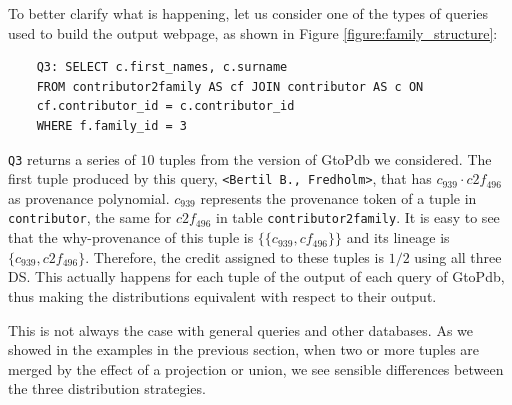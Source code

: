 To better clarify what is happening, let us consider one of the types of queries used to build the output webpage, as shown in Figure \ref{figure:family_structure}:

\vspace{2mm}
{\footnotesize
\begin{adjustwidth}{25pt}{5pt}
	\begin{verbatim}
	Q3: SELECT c.first_names, c.surname
	FROM contributor2family AS cf JOIN contributor AS c ON 
	cf.contributor_id = c.contributor_id 
	WHERE f.family_id = 3
\end{verbatim}
\end{adjustwidth}
}
\vspace{2mm}

\texttt{Q3} returns a series of $10$ tuples from the version of GtoPdb we considered. 
The first tuple produced by this query, \texttt{<Bertil B., Fredholm>}, that has $c_{939} \cdot c2f_{496}$ as provenance polynomial.
$c_{939}$ represents the provenance token of a tuple in \texttt{contributor}, the same for $c2f_{496}$ in table \texttt{contributor2family}. 
It is easy to see that the why-provenance of this tuple is $\{\{c_{939}, cf_{496} \}\}$ and its lineage is $\{c_{939}, c2f_{496} \}$.
Therefore, the credit assigned to these tuples is $1/2$ using all three DS.
This actually happens for each tuple of the output of each query of GtoPdb, thus making the distributions equivalent with respect to their output.

This is not always the case with general queries and other databases. As we showed in the examples in the previous section, when two or more tuples are merged by the effect of a projection or union, we see sensible differences between the three distribution strategies. %

